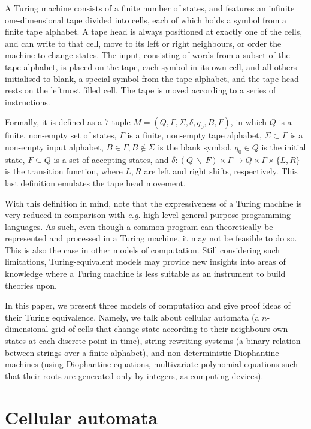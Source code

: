 \documentclass[12pt]{article}
\begin{document}
A Turing machine consists of a finite number of states, and features an infinite one-dimensional tape divided into cells, each of which holds a symbol from a finite tape alphabet. A tape head is always positioned at exactly one of the cells, and can write to that cell, move to its left or right neighbours, or order the machine to change states. The input, consisting of words from a subset of the tape alphabet, is placed on the tape, each symbol in its own cell, and all others initialised to blank, a special symbol from the tape alphabet, and the tape head rests on the leftmost filled cell. The tape is moved according to a series of instructions.

Formally, it is defined as a $7$-tuple $M = (Q, \Gamma, \Sigma, \delta, q_{0}, B, F)$, in which $Q$ is a finite, non-empty set of states, $\Gamma$ is a finite, non-empty tape alphabet, $\Sigma \subset \Gamma$ is a non-empty input alphabet, $B \in \Gamma, B \not\in \Sigma$ is the blank symbol, $q_{0} \in Q$ is the initial state, $F \subseteq Q$ is a set of accepting states, and $\delta : (Q \: \backslash \: F) \times \Gamma \rightarrow Q \times \Gamma \times \{L, R\}$ is the transition function, where $L, R$ are left and right shifts, respectively. This last definition emulates the tape head movement.

With this definition in mind, note that the expressiveness of a Turing machine is very reduced in comparison with \emph{e.g.} high-level general-purpose programming languages. As such, even though a common program can theoretically be represented and processed in a Turing machine, it may not be feasible to do so. This is also the case in other models of computation. Still considering such limitations, Turing-equivalent models may provide new insights into areas of knowledge where a Turing machine is less suitable as an instrument to build theories upon.

In this paper, we present three models of computation and give proof ideas of their Turing equivalence. Namely, we talk about cellular automata (a $n$-dimensional grid of cells that change state according to their neighbours own states at each discrete point in time), string rewriting systems (a binary relation between strings over a finite alphabet), and non-deterministic Diophantine machines (using Diophantine equations, multivariate polynomial equations such that their roots are generated only by integers, as computing devices).

\section{Cellular automata}\label{sec:ca}
\end{document}
